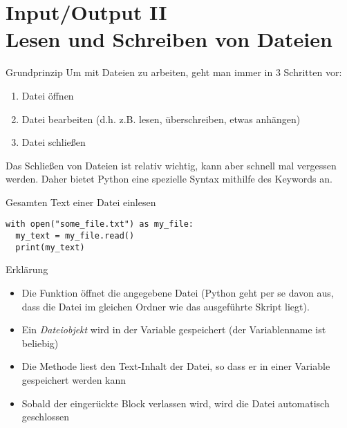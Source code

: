 
\section{Input/Output II \\ \footnotesize Lesen und Schreiben von Dateien}

\begin{frame}
	
\begin{block}{Grundprinzip}
\vspace{2pt}
Um mit Dateien zu arbeiten, geht man immer in 3 Schritten vor:
\pause 
\begin{enumerate}
	\item<2-> Datei öffnen 
	\item<3-> Datei bearbeiten (d.h. z.B. lesen, überschreiben, etwas anhängen)
	\item<4-> Datei schließen
\end{enumerate}
\pause \pause \pause
Das Schließen von Dateien ist relativ wichtig, kann aber schnell mal vergessen werden. Daher bietet Python eine spezielle Syntax mithilfe des Keywords  an. 
\end{block}
\end{frame}


\begin{fragile}
\begin{block}{Gesamten Text einer Datei einlesen}
\vspace{2pt}
\pause 
\begin{verbatim}
with open("some_file.txt") as my_file:
  my_text = my_file.read()
  print(my_text)
\end{verbatim}

\pause
\vspace{12pt}

\begin{exampleblock}{Erklärung}
\vspace{2pt}
\begin{itemize}[<+->]
	\item Die Funktion  öffnet die angegebene Datei (Python geht per se davon aus, dass die Datei im gleichen Ordner wie das ausgeführte Skript liegt).
	\item Ein \emph{Dateiobjekt} wird in der Variable  gespeichert (der Variablenname ist beliebig)
	\item Die Methode  liest den Text-Inhalt der Datei, so dass er in einer Variable gespeichert werden kann 
	\item Sobald der eingerückte Block verlassen wird, wird die Datei automatisch geschlossen
\end{itemize}
\end{exampleblock}

\end{block}
\end{fragile}

